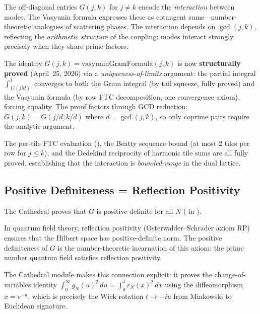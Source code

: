 \documentclass[11pt,a4paper]{article}
\begin{document}
\begin{observation}[Off-Diagonal = Interaction (Structurally Proved)]
The off-diagonal entries $G(j,k)$ for $j \neq k$ encode the
\emph{interaction} between modes. The Vasyunin formula expresses these
as cotangent sums---number-theoretic analogues of scattering phases.
The interaction depends on $\gcd(j,k)$, reflecting the
\emph{arithmetic structure} of the coupling: modes interact strongly
precisely when they share prime factors.

The identity $G(j,k) = \text{vasyuninGramFormula}(j,k)$ is now
\textbf{structurally proved} (April~25, 2026) via a
\emph{uniqueness-of-limits} argument: the partial integral
$\int_{1/(jM)}^1$ converges to both the Gram integral (by tail
squeeze, fully proved) and the Vasyunin formula (by row FTC
decomposition, one convergence axiom), forcing equality. The proof
factors through GCD reduction: $G(j,k) = G(j/d, k/d)$ where
$d = \gcd(j,k)$, so only coprime pairs require the analytic argument.

The per-tile FTC evaluation (),
the Beatty sequence bound (at most 2 tiles per row for $j \leq k$),
and the Dedekind reciprocity of harmonic tile sums are all
fully proved, establishing that the interaction is
\emph{bounded-range} in the dual lattice.
\end{observation}

\subsection{Positive Definiteness = Reflection Positivity}

The Cathedral proves that $G$ is positive definite for all $N$
( in ).

\begin{principle}
In quantum field theory, reflection positivity (Osterwalder--Schrader
axiom RP) ensures that the Hilbert space has positive-definite norm.
The positive definiteness of $G$ is the number-theoretic incarnation
of this axiom: the prime number quantum field satisfies reflection
positivity.

The Cathedral module  makes this connection
explicit: it proves the change-of-variables identity
$\int_0^\infty g_N(u)^2\,du = \int_0^1 r_N(x)^2\,dx$
using the diffeomorphism $x = e^{-u}$, which is precisely the
Wick rotation $t \to -iu$ from Minkowski to Euclidean signature.
\end{principle}
\end{document}
